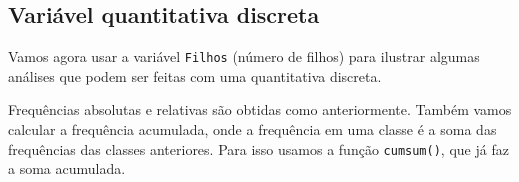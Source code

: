 \documentclass[
  10pt,
  a4paper]{book}
\newenvironment{Shaded}{\begin{snugshade}}{\end{snugshade}}
\newcommand{\CommentTok}[1]{\textcolor[rgb]{0.56,0.35,0.01}{\textit{#1}}}
\newcommand{\ControlFlowTok}[1]{\textcolor[rgb]{0.13,0.29,0.53}{\textbf{#1}}}
\newcommand{\DecValTok}[1]{\textcolor[rgb]{0.00,0.00,0.81}{#1}}
\newcommand{\DocumentationTok}[1]{\textcolor[rgb]{0.56,0.35,0.01}{\textbf{\textit{#1}}}}
\newcommand{\FunctionTok}[1]{\textcolor[rgb]{0.00,0.00,0.00}{#1}}
\newcommand{\NormalTok}[1]{#1}
\newcommand{\SpecialCharTok}[1]{\textcolor[rgb]{0.00,0.00,0.00}{#1}}
\newcommand{\StringTok}[1]{\textcolor[rgb]{0.31,0.60,0.02}{#1}}
\begin{document}
\begin{Shaded}
\end{Shaded}

\hypertarget{variuxe1vel-quantitativa-discreta}{%
\subsection{Variável quantitativa discreta}\label{variuxe1vel-quantitativa-discreta}}

Vamos agora usar a variável \texttt{Filhos} (número de filhos) para
ilustrar algumas análises que podem ser feitas com uma quantitativa
discreta.

Frequências absolutas e relativas são obtidas como anteriormente. Também
vamos calcular a frequência acumulada, onde a frequência em uma classe é
a soma das frequências das classes anteriores. Para isso usamos a função
\texttt{cumsum()}, que já faz a soma acumulada.
\end{document}
